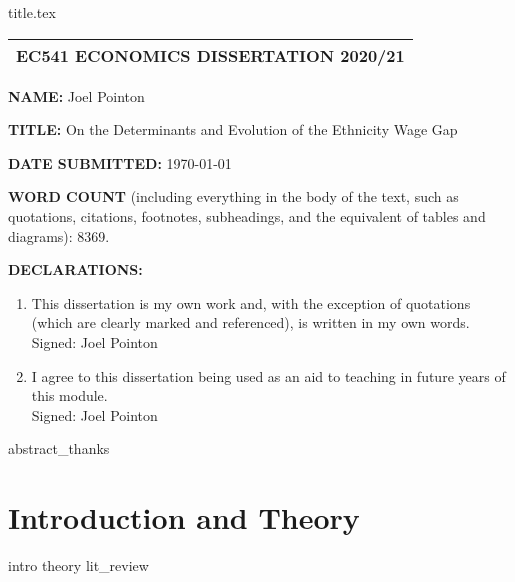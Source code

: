 \documentclass[openany,a4paper,12pt]{book}
\begin{document}
\pagestyle{headings}
\pagestyle{fancy}
\fancyfoot[R]{\thepage}

\frontmatter
{title.tex}
\clearpage
\setcounter{page}{1}
\thispagestyle{plain}
\doublespacing
\begin{center}
         \begin{tabular}{| c |} 
         \hline
         \textbf{EC541 ECONOMICS DISSERTATION 2020/21} \\
         \hline
        \end{tabular}
\end{center}
\vspace{15pt}
\indent \indent \textbf{NAME:} Joel Pointon
\vspace{30pt}

\textbf{TITLE:} On the Determinants and Evolution of the Ethnicity Wage Gap
\vspace{30pt}

\textbf{DATE SUBMITTED:} \today
\vspace{30pt}

\textbf{WORD COUNT} (including everything in the body of the text, such as quotations, citations, footnotes, subheadings, and the equivalent of tables and diagrams): 8369. %
\vspace{30pt}

\textbf{DECLARATIONS:}
\begin{enumerate}
    \item This dissertation is my own work and, with the exception of quotations (which are clearly marked and referenced), is written in my own words. \\Signed: Joel Pointon
    \item I agree to this dissertation being used as an aid to teaching in future years of this module. \\Signed: Joel Pointon
\end{enumerate}
\newpage
{abstract_thanks} %
\let\cleardoublepage\clearpage
\thispagestyle{plain}
\tableofcontents
\newpage
\thispagestyle{plain}
\listoftables
\newpage
\listoffigures
\mainmatter %
\newpage
\chapter{Introduction and Theory} %
{intro} %
{theory} %
{lit_review} %
\end{document}
